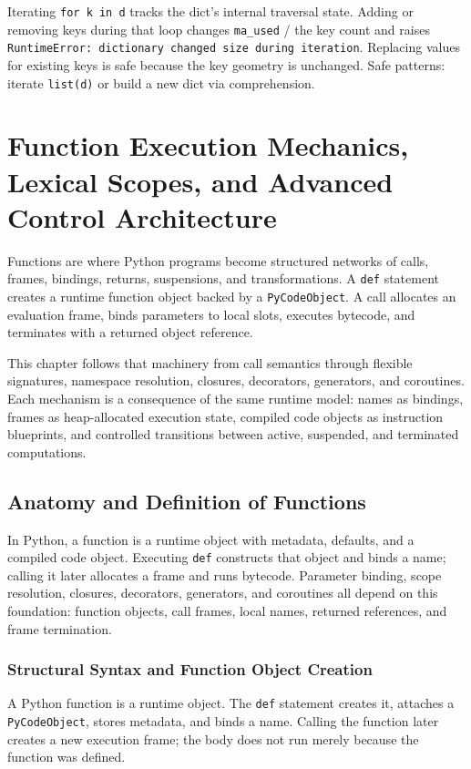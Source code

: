 \documentclass[a4paper,twoside]{report}
\begin{document}
Iterating \texttt{for k in d} tracks the dict's internal traversal state. Adding or removing keys during that loop changes \texttt{ma\_used} / the key count and raises \texttt{RuntimeError: dictionary changed size during iteration}. Replacing values for existing keys is safe because the key geometry is unchanged. Safe patterns: iterate \texttt{list(d)} or build a new dict via comprehension.


\chapter{Function Execution Mechanics, Lexical Scopes, and Advanced Control Architecture}

Functions are where Python programs become structured networks of calls, frames, bindings, returns, suspensions, and transformations. A \texttt{def} statement creates a runtime function object backed by a \texttt{PyCodeObject}. A call allocates an evaluation frame, binds parameters to local slots, executes bytecode, and terminates with a returned object reference.

This chapter follows that machinery from call semantics through flexible signatures, namespace resolution, closures, decorators, generators, and coroutines. Each mechanism is a consequence of the same runtime model: names as bindings, frames as heap-allocated execution state, compiled code objects as instruction blueprints, and controlled transitions between active, suspended, and terminated computations.


\section{Anatomy and Definition of Functions}

In Python, a function is a runtime object with metadata, defaults, and a compiled code object. Executing \texttt{def} constructs that object and binds a name; calling it later allocates a frame and runs bytecode. Parameter binding, scope resolution, closures, decorators, generators, and coroutines all depend on this foundation: function objects, call frames, local names, returned references, and frame termination.


\subsection{Structural Syntax and Function Object Creation}

A Python function is a runtime object. The \texttt{def} statement creates it, attaches a \texttt{PyCodeObject}, stores metadata, and binds a name. Calling the function later creates a new execution frame; the body does not run merely because the function was defined.
\end{document}
